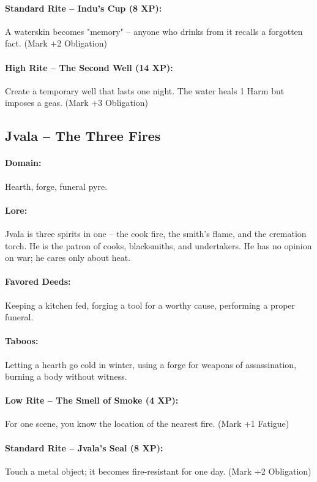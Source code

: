 \documentclass[11pt]{book}
\begin{document}
\paragraph{Standard Rite -- Indu's Cup (8 XP):} A waterskin becomes "memory" -- anyone who drinks from it recalls a forgotten fact. (Mark +2 Obligation)
\paragraph{High Rite -- The Second Well (14 XP):} Create a temporary well that lasts one night. The water heals 1 Harm but imposes a geas. (Mark +3 Obligation)

\subsection{Jvala -- The Three Fires}
\paragraph{Domain:} Hearth, forge, funeral pyre.
\paragraph{Lore:} Jvala is three spirits in one -- the cook fire, the smith's flame, and the cremation torch. He is the patron of cooks, blacksmiths, and undertakers. He has no opinion on war; he cares only about heat.
\paragraph{Favored Deeds:} Keeping a kitchen fed, forging a tool for a worthy cause, performing a proper funeral.
\paragraph{Taboos:} Letting a hearth go cold in winter, using a forge for weapons of assassination, burning a body without witness.
\paragraph{Low Rite -- The Smell of Smoke (4 XP):} For one scene, you know the location of the nearest fire. (Mark +1 Fatigue)
\paragraph{Standard Rite -- Jvala's Seal (8 XP):} Touch a metal object; it becomes fire‑resistant for one day. (Mark +2 Obligation)
\end{document}
